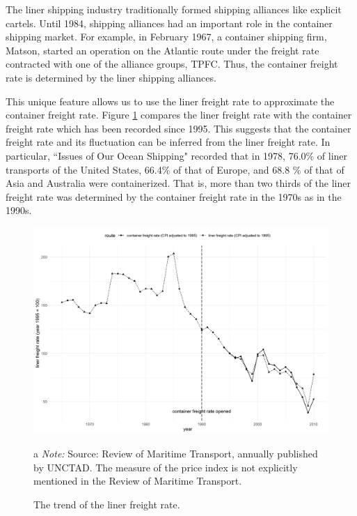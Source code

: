 The liner shipping industry traditionally formed shipping alliances like explicit cartels. Until 1984, shipping alliances had an important role in the container shipping market. For example, in February 1967, a container shipping firm, Matson, started an operation on the Atlantic route under the freight rate contracted with one of the alliance groups, TPFC. Thus, the container freight rate is determined by the liner shipping alliances.

This unique feature allows us to use the liner freight rate to approximate the container freight rate. Figure \ref{fg:liner_freight_rate} compares the liner freight rate with the container freight rate which has been recorded since 1995. This suggests that the container freight rate and its fluctuation can be inferred from the liner freight rate. In particular, ``Issues of Our Ocean Shipping" recorded that in 1978, 76.0\% of liner transports of the United States, 66.4\% of that of Europe, and 68.8 \% of that of Asia and Australia were containerized. That is, more than two thirds of the liner freight rate was determined by the container freight rate in the 1970s as in the 1990s.


\begin{figure}[!ht]
\begin{center}
\includegraphics[height = 0.4\textheight]{figuretable/liner_freight_rate.png}
\end{center}
\caption{The trend of the liner freight rate.}
\begin{tablenotes}
\item[a]\textit{Note:} Source: Review of Maritime Transport, annually published by UNCTAD. The measure of the price index is not explicitly mentioned in the Review of Maritime Transport. 
\end{tablenotes}
\label{fg:liner_freight_rate}
\end{figure}


